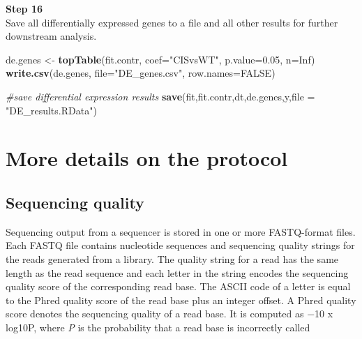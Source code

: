 \documentclass[]{book}
\newenvironment{Shaded}{\begin{snugshade}}{\end{snugshade}}
\newcommand{\CommentTok}[1]{\textcolor[rgb]{0.56,0.35,0.01}{\textit{#1}}}
\newcommand{\DataTypeTok}[1]{\textcolor[rgb]{0.13,0.29,0.53}{#1}}
\newcommand{\FloatTok}[1]{\textcolor[rgb]{0.00,0.00,0.81}{#1}}
\newcommand{\KeywordTok}[1]{\textcolor[rgb]{0.13,0.29,0.53}{\textbf{#1}}}
\newcommand{\NormalTok}[1]{#1}
\newcommand{\OtherTok}[1]{\textcolor[rgb]{0.56,0.35,0.01}{#1}}
\newcommand{\StringTok}[1]{\textcolor[rgb]{0.31,0.60,0.02}{#1}}
\begin{document}
\textbf{Step 16}\\

Save all differentially expressed genes to a file and all other results for further downstream analysis.

\begin{Shaded}
\begin{Highlighting}[]
\NormalTok{de.genes <-}\StringTok{ }\KeywordTok{topTable}\NormalTok{(fit.contr, }\DataTypeTok{coef=}\StringTok{"CISvsWT"}\NormalTok{, }\DataTypeTok{p.value=}\FloatTok{0.05}\NormalTok{, }\DataTypeTok{n=}\OtherTok{Inf}\NormalTok{)}
\KeywordTok{write.csv}\NormalTok{(de.genes, }\DataTypeTok{file=}\StringTok{"DE_genes.csv"}\NormalTok{, }\DataTypeTok{row.names=}\OtherTok{FALSE}\NormalTok{)}
\end{Highlighting}
\end{Shaded}

\begin{Shaded}
\begin{Highlighting}[]
\CommentTok{#save differential expression results}
\KeywordTok{save}\NormalTok{(fit,fit.contr,dt,de.genes,y,}\DataTypeTok{file =} \StringTok{"DE_results.RData"}\NormalTok{)}
\end{Highlighting}
\end{Shaded}

\hypertarget{more-details-on-the-protocol}{%
\chapter{More details on the protocol}\label{more-details-on-the-protocol}}

\hypertarget{sequencing-quality}{%
\section{Sequencing quality}\label{sequencing-quality}}

Sequencing output from a sequencer is stored in one or more FASTQ-format files. Each FASTQ
file contains nucleotide sequences and sequencing quality strings for the reads generated from a
library. The quality string for a read has the same length as the read sequence and each letter in the string encodes the sequencing quality score of the corresponding read base. The ASCII code of a letter is equal to the Phred quality score of the read base plus an integer offset.
A Phred quality score denotes the sequencing quality of a read base. It is computed as −10 x log10P, where \emph{P} is the probability that a read base is incorrectly called
\end{document}
